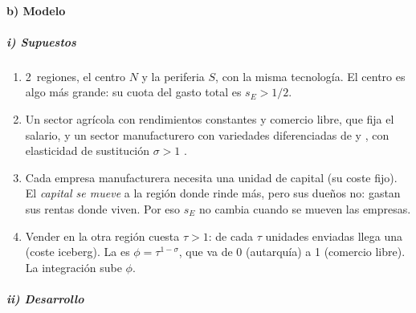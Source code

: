 \documentclass[11pt]{article}
\begin{document}
\paragraph{b) Modelo}

\subparagraph{i) Supuestos}

\begin{enumerate}
\item 2~regiones, el centro $N$ y la periferia $S$, con la misma tecnología. El centro es algo más grande: su cuota del gasto total es $s_E>1/2$.
\item Un sector agrícola con rendimientos constantes y comercio libre, que fija el salario, y un sector manufacturero con variedades diferenciadas de  y , con elasticidad de sustitución $\sigma>1$ .
\item Cada empresa manufacturera necesita una unidad de capital (su coste fijo). El \emph{capital se mueve} a la región donde rinde más, pero sus dueños no: gastan sus rentas donde viven. Por eso $s_E$ no cambia cuando se mueven las empresas.
\item Vender en la otra región cuesta $\tau>1$: de cada $\tau$ unidades enviadas llega una (coste iceberg). La  es $\phi=\tau^{1-\sigma}$, que va de 0 (autarquía) a 1 (comercio libre). La integración sube $\phi$.
\end{enumerate}

\subparagraph{ii) Desarrollo}
\end{document}
